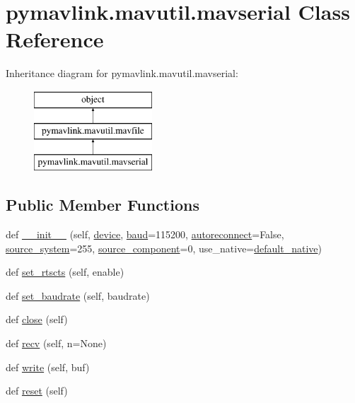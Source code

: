\hypertarget{classpymavlink_1_1mavutil_1_1mavserial}{}\section{pymavlink.\+mavutil.\+mavserial Class Reference}
\label{classpymavlink_1_1mavutil_1_1mavserial}
Inheritance diagram for pymavlink.\+mavutil.\+mavserial\+:\begin{figure}[H]
\begin{center}
\leavevmode
\includegraphics[height=3.000000cm]{classpymavlink_1_1mavutil_1_1mavserial}
\end{center}
\end{figure}
\subsection*{Public Member Functions}
\begin{DoxyCompactItemize}
\item 
def \mbox{\hyperlink{classpymavlink_1_1mavutil_1_1mavserial_a58a367989819aa421781a816ce1586bb}{\+\_\+\+\_\+init\+\_\+\+\_\+}} (self, \mbox{\hyperlink{classpymavlink_1_1mavutil_1_1mavserial_a42ee22c9edea351a8228113efb0c1907}{device}}, \mbox{\hyperlink{classpymavlink_1_1mavutil_1_1mavserial_a30e81076e135f155338cdb028d634bdb}{baud}}=115200, \mbox{\hyperlink{classpymavlink_1_1mavutil_1_1mavserial_aec2ff119c2631f63d3608bd347133183}{autoreconnect}}=False, \mbox{\hyperlink{classpymavlink_1_1mavutil_1_1mavfile_a02c06667c79f4414ed9c4ee6a8dec903}{source\+\_\+system}}=255, \mbox{\hyperlink{classpymavlink_1_1mavutil_1_1mavfile_a84e307f771a9ac2aed567831845c417e}{source\+\_\+component}}=0, use\+\_\+native=\mbox{\hyperlink{namespacepymavlink_1_1mavutil_a21ce9da7b698a7bc21c44b9f77341b62}{default\+\_\+native}})
\item 
def \mbox{\hyperlink{classpymavlink_1_1mavutil_1_1mavserial_af4a1da9b197ebf58110e26b805af1fda}{set\+\_\+rtscts}} (self, enable)
\item 
def \mbox{\hyperlink{classpymavlink_1_1mavutil_1_1mavserial_aa69a31cb7e3cee07ec43174501cb79ac}{set\+\_\+baudrate}} (self, baudrate)
\item 
def \mbox{\hyperlink{classpymavlink_1_1mavutil_1_1mavserial_a3e2176f72a1c7590584597cb63d12eb2}{close}} (self)
\item 
def \mbox{\hyperlink{classpymavlink_1_1mavutil_1_1mavserial_acd3d12828b5794091b0984d65c292770}{recv}} (self, n=None)
\item 
def \mbox{\hyperlink{classpymavlink_1_1mavutil_1_1mavserial_a6d0072efcfa0a49f95de45a8475b26e8}{write}} (self, buf)
\item 
def \mbox{\hyperlink{classpymavlink_1_1mavutil_1_1mavserial_a0ab2dd40a877e6d0e4bf8f9232805fb9}{reset}} (self)
\end{DoxyCompactItemize}
